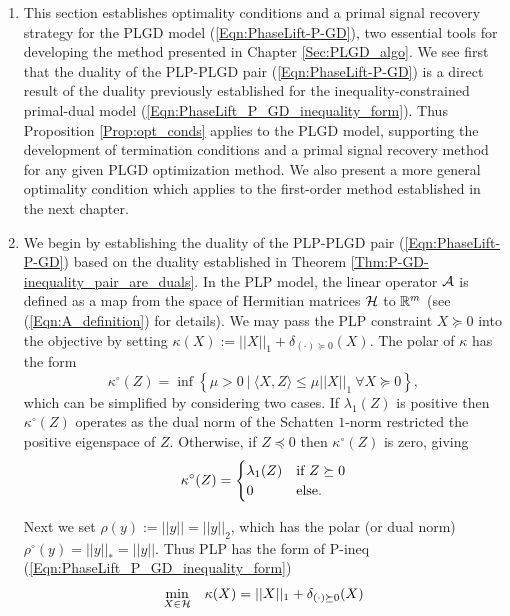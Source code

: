 \begin{enumerate}

\item


This section establishes optimality conditions and a primal signal recovery strategy for the PLGD model (\ref{Eqn:PhaseLift-P-GD}), two essential tools for developing the method presented in Chapter \ref{Sec:PLGD_algo}.  We see first that the duality of the PLP-PLGD pair (\ref{Eqn:PhaseLift-P-GD}) is a direct result of the duality previously established for the inequality-constrained primal-dual model (\ref{Eqn:PhaseLift_P_GD_inequality_form}).  Thus Proposition \ref{Prop:opt_conds} applies to the PLGD model, supporting the development of termination conditions and a primal signal recovery method for any given PLGD optimization method.  We also present a more general optimality condition which applies to the first-order method established in the next chapter.



\item

We begin by establishing the duality of the PLP-PLGD pair (\ref{Eqn:PhaseLift-P-GD}) based on the duality established in Theorem \ref{Thm:P-GD-inequality_pair_are_duals}.  In the PLP model, the linear operator ${\mathcal A}$ is defined as a map from the space of Hermitian matrices ${\mathcal H}$ to ${\mathbb R}^m$ (see (\ref{Eqn:A_definition}) for details).  We may pass the PLP constraint $X \succeq 0$ into the objective by setting $\kappa(X) := ||X||_1 + \delta_{(\cdot) \succeq 0}(X)$.  The polar of $\kappa$ has the form  
\[
\kappa^\circ(Z) = \inf \left\{ \mu > 0 \ | \ \langle X, Z \rangle \leq \mu ||X||_1 \ \forall X \succeq 0 \right\},
\]
which can be simplified by considering two cases. If $\lambda_1(Z)$ is positive then $\kappa^\circ(Z)$ operates as the dual norm of the Schatten $1$-norm restricted the positive eigenspace of $Z$.  Otherwise, if $Z \preceq 0$ then $\kappa^\circ(Z)$ is zero, giving
\begin{equation}			\label{Eqn:kappa_polar}
\kappa^\circ(Z) = 
	\begin{cases}
		\lambda_1(Z)	&	\textnormal{if } Z \succeq 0	\\
		0	&	\textnormal{else}.
	\end{cases}
\end{equation}

Next we set $\rho(y) := ||y||= ||y||_2$, which has the polar (or dual norm) $\rho^\circ(y) = ||y||_* = ||y||$.  Thus PLP has the form of P-ineq (\ref{Eqn:PhaseLift_P_GD_inequality_form})
\begin{equation*} 			
\begin{array}{ll}
		\min\limits_{\substack{X \in {\mathcal H}}}
		&	\kappa(X) = ||X||_1 + \delta_{(\cdot) \succeq 0}(X)
						\\


\end{array}
\end{equation*}
\end{enumerate}

